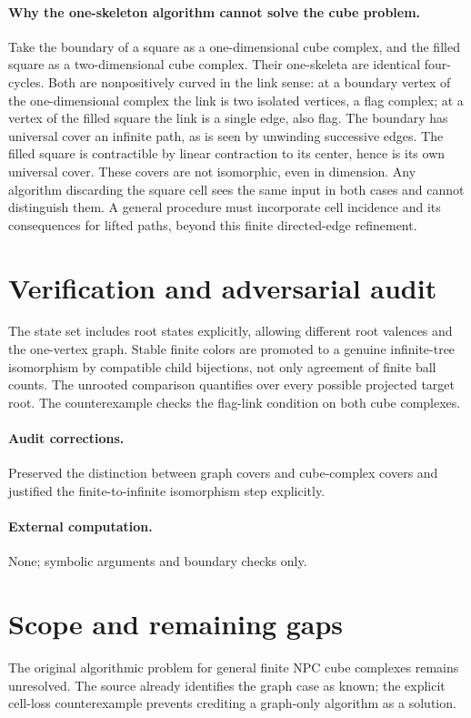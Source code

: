 \documentclass[11pt]{article}
\begin{document}
\paragraph{Why the one-skeleton algorithm cannot solve the cube problem.}
Take the boundary of a square as a one-dimensional cube complex, and the filled square as a two-dimensional cube complex. Their one-skeleta are identical four-cycles. Both are nonpositively curved in the link sense: at a boundary vertex of the one-dimensional complex the link is two isolated vertices, a flag complex; at a vertex of the filled square the link is a single edge, also flag. The boundary has universal cover an infinite path, as is seen by unwinding successive edges. The filled square is contractible by linear contraction to its center, hence is its own universal cover. These covers are not isomorphic, even in dimension. Any algorithm discarding the square cell sees the same input in both cases and cannot distinguish them. A general procedure must incorporate cell incidence and its consequences for lifted paths, beyond this finite directed-edge refinement.
\section{Verification and adversarial audit}
The state set includes root states explicitly, allowing different root valences and the one-vertex graph. Stable finite colors are promoted to a genuine infinite-tree isomorphism by compatible child bijections, not only agreement of finite ball counts. The unrooted comparison quantifies over every possible projected target root. The counterexample checks the flag-link condition on both cube complexes.
\paragraph{Audit corrections.} Preserved the distinction between graph covers and cube-complex covers and justified the finite-to-infinite isomorphism step explicitly.
\paragraph{External computation.} None; symbolic arguments and boundary checks only.
\section{Scope and remaining gaps}
The original algorithmic problem for general finite NPC cube complexes remains unresolved. The source already identifies the graph case as known; the explicit cell-loss counterexample prevents crediting a graph-only algorithm as a solution.
\end{document}
